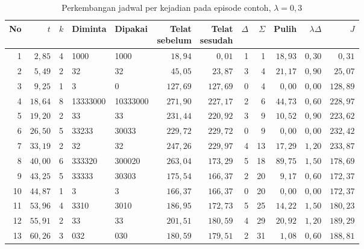 \begin{table}[htbp]
\caption{Perkembangan jadwal per kejadian pada episode contoh, $\lambda = 0{,}3$}
\label{tab:episode-lam03}
\centering\footnotesize
\setlength{\tabcolsep}{4pt}
\begin{adjustbox}{max width=\textwidth}
\begin{tabular}{rrcllrrrrrrr}
\toprule
No & $t$ & $k$ & Diminta & Dipakai & \shortstack[r]{Telat\\sebelum} & \shortstack[r]{Telat\\sesudah} & $\Delta$ & $\Sigma$ & Pulih & $\lambda\Delta$ & $J$ \\
\midrule
1 & $2{,}85$ & 4 & 1000 & 1000 & $18{,}94$ & $0{,}01$ & 1 & 1 & $18{,}93$ & $0{,}30$ & $0{,}31$ \\
2 & $5{,}49$ & 2 & 32 & 32 & $45{,}05$ & $23{,}87$ & 3 & 4 & $21{,}17$ & $0{,}90$ & $25{,}07$ \\
3 & $9{,}25$ & 1 & 3 & 0 & $127{,}69$ & $127{,}69$ & 0 & 4 & $0{,}00$ & $0{,}00$ & $128{,}89$ \\
4 & $18{,}64$ & 8 & 13333000 & 10333000 & $271{,}90$ & $227{,}17$ & 2 & 6 & $44{,}73$ & $0{,}60$ & $228{,}97$ \\
5 & $19{,}20$ & 2 & 33 & 33 & $231{,}44$ & $220{,}92$ & 3 & 9 & $10{,}52$ & $0{,}90$ & $223{,}62$ \\
6 & $26{,}50$ & 5 & 33233 & 30033 & $229{,}72$ & $229{,}72$ & 0 & 9 & $0{,}00$ & $0{,}00$ & $232{,}42$ \\
7 & $33{,}19$ & 2 & 32 & 32 & $247{,}26$ & $229{,}97$ & 4 & 13 & $17{,}29$ & $1{,}20$ & $233{,}87$ \\
8 & $40{,}00$ & 6 & 333320 & 300020 & $263{,}04$ & $173{,}29$ & 5 & 18 & $89{,}75$ & $1{,}50$ & $178{,}69$ \\
9 & $43{,}25$ & 5 & 33333 & 30303 & $175{,}54$ & $166{,}37$ & 2 & 20 & $9{,}17$ & $0{,}60$ & $172{,}37$ \\
10 & $44{,}87$ & 1 & 3 & 3 & $166{,}37$ & $166{,}37$ & 0 & 20 & $0{,}00$ & $0{,}00$ & $172{,}37$ \\
11 & $53{,}96$ & 4 & 3310 & 3010 & $186{,}95$ & $172{,}73$ & 5 & 25 & $14{,}22$ & $1{,}50$ & $180{,}23$ \\
12 & $55{,}91$ & 2 & 33 & 33 & $201{,}51$ & $180{,}59$ & 4 & 29 & $20{,}92$ & $1{,}20$ & $189{,}29$ \\
13 & $60{,}26$ & 3 & 032 & 030 & $180{,}59$ & $179{,}51$ & 2 & 31 & $1{,}08$ & $0{,}60$ & $188{,}81$ \\

\end{tabular}
\end{adjustbox}
\end{table}
